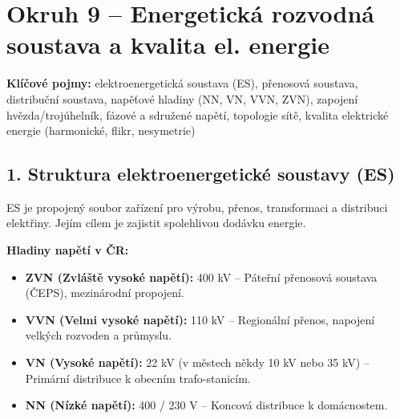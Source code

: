 \documentclass[a4paper,10pt]{article}
\begin{document}
\section*{\large Okruh 9 – Energetická rozvodná soustava a kvalita el. energie}

\begin{pojmybox}
\textbf{Klíčové pojmy:}
elektroenergetická soustava (ES), přenosová soustava, distribuční soustava, napěťové hladiny (NN, VN, VVN, ZVN), zapojení hvězda/trojúhelník, fázové a sdružené napětí, topologie sítě, kvalita elektrické energie (harmonické, flikr, nesymetrie)
\end{pojmybox}

\begin{vysvetlenibox}

\subsection*{1. Struktura elektroenergetické soustavy (ES)}

ES je propojený soubor zařízení pro výrobu, přenos, transformaci a distribuci elektřiny. Jejím cílem je zajistit spolehlivou dodávku energie.

\textbf{Hladiny napětí v ČR:}
\begin{itemize}
    \item \textbf{ZVN (Zvláště vysoké napětí):} 400 kV – Páteřní přenosová soustava (ČEPS), mezinárodní propojení.
    \item \textbf{VVN (Velmi vysoké napětí):} 110 kV – Regionální přenos, napojení velkých rozvoden a průmyslu.
    \item \textbf{VN (Vysoké napětí):} 22 kV (v městech někdy 10 kV nebo 35 kV) – Primární distribuce k obecním trafo-stanicím.
    \item \textbf{NN (Nízké napětí):} 400 / 230 V – Koncová distribuce k domácnostem.
\end{itemize}

\begin{center}
\end{center}
\end{vysvetlenibox}
\end{document}
